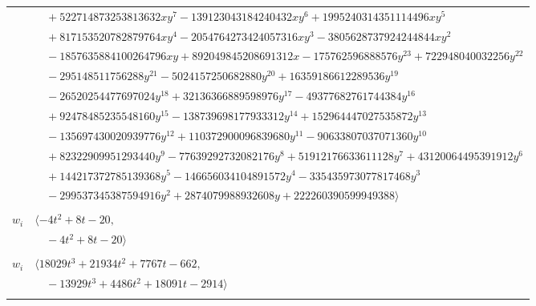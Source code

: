 \documentclass[11pt]{article}
\begin{document}
\begin{longtable}{@{}ll@{}}
 & $\quad +522714873253813632xy^{7}-139123043184240432xy^{6}+1995240314351114496xy^{5}$\\
 & $\quad +817153520782879764xy^{4}-2054764273424057316xy^{3}-3805628737924244844xy^{2}$\\
 & $\quad -1857635884100264796xy+892049845208691312x-175762596888576y^{23}+722948040032256y^{22}$\\
 & $\quad -295148511756288y^{21}-5024157250682880y^{20}+16359186612289536y^{19}$\\
 & $\quad -26520254477697024y^{18}+32136366889598976y^{17}-49377682761744384y^{16}$\\
 & $\quad +92478485235548160y^{15}-138739698177933312y^{14}+152964447027535872y^{13}$\\
 & $\quad -135697430020939776y^{12}+110372900096839680y^{11}-90633807037071360y^{10}$\\
 & $\quad +82322909951293440y^{9}-77639292732082176y^{8}+51912176633611128y^{7}+43120064495391912y^{6}$\\
 & $\quad +144217372785139368y^{5}-146656034104891572y^{4}-335435973077817468y^{3}$\\
 & $\quad -299537345387594916y^{2}+2874079988932608y+222260390599949388\rangle$\\
\addlinespace[2pt]
\multicolumn{2}{@{}p{0.97\textwidth}@{}}{$i=11$, $D_i=1$, $\varphi_i=1$, $e_i=1$, $\rho_{ij}$: $9{:}1, \allowbreak 10{:}1, \allowbreak 26{:}1, \allowbreak 28{:}2, \allowbreak 29{:}1, \allowbreak 35{:}3$}\\
$w_i$ & $\langle -4t^{2}+8t-20,$\\
 & $\quad -4t^{2}+8t-20\rangle$\\
\addlinespace[2pt]
\multicolumn{2}{@{}p{0.97\textwidth}@{}}{$i=12$, $D_i=128$, $\varphi_i=1$, $\rho_{ij}$: $4{:}3, \allowbreak 7{:}3, \allowbreak 9{:}2, \allowbreak 10{:}3, \allowbreak 14{:}2, \allowbreak 16{:}1, \allowbreak 21{:}1, \allowbreak 25{:}1, \allowbreak 28{:}2, \allowbreak 31{:}1, \allowbreak 39{:}1, \allowbreak 40{:}3, \allowbreak 43{:}3, \allowbreak 46{:}1$}\\
$w_i$ & $\langle 18029t^{3}+21934t^{2}+7767t-662,$\\
 & $\quad -13929t^{3}+4486t^{2}+18091t-2914\rangle$\\
\addlinespace[2pt]
\multicolumn{2}{@{}p{0.97\textwidth}@{}}{$i=13$, $D_i=1$, $\varphi_i=1$, $\rho_{ij}$: $0{:}1, \allowbreak 5{:}2, \allowbreak 10{:}1, \allowbreak 16{:}2, \allowbreak 24{:}2, \allowbreak 31{:}3, \allowbreak 38{:}3, \allowbreak 40{:}3, \allowbreak 44{:}3$}\\

\end{longtable}
\end{document}
